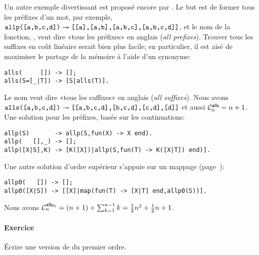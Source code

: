Un autre exemple divertissant est proposé encore par
\cite{Danvy_1988,Danvy_1989}. Le but est de former tous les préfixes
d'un mot, par exemple, \(\erlcode{allp([a,b,c,d])} \twoheadrightarrow
\erlcode{[[a],[a,b],[a,b,c],[a,b,c,d]]}\), et le nom de la fonction,
, veut dire «tous les préfixes» en anglais (\emph{all
  prefixes}). Trouver tous les suffixes en coût linéaire serait bien
plus facile; en particulier, il est aisé de maximiser le partage de la
mémoire à l'aide d'un synonyme:
\begin{verbatim}
alls(     []) -> [];
alls(S=[_|T]) -> [S|alls(T)].
\end{verbatim}
Le nom  veut dire «tous les suffixes» en anglais
(\emph{all suffixes}). Nous avons \(\erlcode{alls([a,b,c,d])}
\twoheadrightarrow \erlcode{[[a,b,c,d],[b,c,d],[c,d],[d]]}\) et aussi
\(\C{\fun{alls}}{n} = n + 1\).
Une solution pour les préfixes, basée sur les continuations:
\begin{verbatim}
allp(S)       -> allp(S,fun(X) -> X end).
allp(   [],_) -> [];
allp([X|S],K) -> [K([X])|allp(S,fun(T) -> K([X|T]) end)].
\end{verbatim}
Une autre solution d'ordre supérieur s'appuie sur un mappage\!
(page~\pageref{par_maps}):
\begin{verbatim}
allp0(   []) -> [];
allp0([X|S]) -> [[X]|map(fun(T) -> [X|T] end,allp0(S))].
\end{verbatim}
Nous avons \(\C{\fun{allp}_0}{n} = (n+1) + \sum_{k=1}^{n-1}k =
\frac{1}{2}n^2 + \frac{1}{2}n + 1\).

\paragraph{Exercice}

Écrire une version de  du premier ordre.
